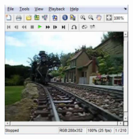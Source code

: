 \documentclass[final]{beamer}
\newlength{\colwidth}
\begin{document}
\begin{frame}[t]
\begin{columns}[t]
\begin{column}{\colwidth}
\begin{multicols}{2}
\lipsum
\begin{figure}
    \centering
    \includegraphics[width=0.5\textwidth , height = 15cm]{images and logos/embedded video frame.pdf}
   

\end{figure}
\end{multicols}
\end{column}
\end{columns}
\end{frame}
\end{document}
